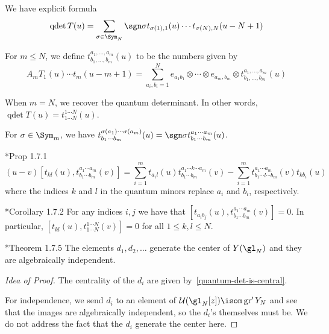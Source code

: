 \documentclass[11pt,leqno,oneside]{amsbook}
\numberwithin{thm}{section}
\newcommand{\U}{\mathcal{U}}
\newcommand{\associatedGraded}{\operatorname{gr}}
\newcommand{\qdet}{\operatorname{qdet}}
\begin{document}
\begin{prop}
  We have explicit formula \[
    \qdet T(u) = \sum_{\sigma \in \Sym_N} \sgn \sigma
    t_{\sigma(1),1}(u) \cdots t_{\sigma(N),N}(u-N+1) 
  \]
\end{prop}
\begin{defn}
  For \(m \leq N\), we define 
  \(t^{a_1,\ldots,a_m}_{b_1,\ldots,b_m}(u)\) to be the numbers given
  by \[
    A_m T_1(u) \cdots t_m(u-m+1) = \sum_{a_i,b_i=1}^N e_{a_1 b_1}
    \otimes \cdots \otimes e_{a_m, b_m} \otimes t^{a_1,\ldots,a_m}_{b_1,\ldots,b_m}(u)
  \]
\end{defn}
\begin{rmk}
  When \(m=N\), we recover the quantum determinant. In other words,
  \(\qdet T(u) = t^{1 \cdots N}_{1 \cdots N}(u)\).
\end{rmk}
\begin{prop}
  For \(\sigma \in \Sym_m\), we have \(t^{\sigma(a_1) \cdots
    \sigma(a_m)}_{b_1 \cdots b_m}(u) = \sgn \sigma t^{a_1 \cdots
    a_m}_{b_1 \cdots b_m}(u)\).
\end{prop}
\begin{lem}
  \cite{molev}*{Prop 1.7.1} \[
    (u-v)[t_{kl}(u),t^{a_1\cdots a_m}_{b_1 \cdots b_m}(v)] =
    \sum_{i=1}^m t_{a_i l}(u)t^{a_1 \cdots k \cdots a_m}_{b_1 \cdots
      b_m}(v) - \sum_{i=1}^m t^{a_1 \cdots a_m}_{b_1 \cdots l \cdots
      b_m}(v)t_{k b_i}(u)
  \]
  where the indices \(k\) and \(l\) in the quantum minors replace
  \(a_i\) and \(b_i\), respectively.
\end{lem}
\begin{cor}\label{quantum-det-is-central}
  \cite{molev}*{Corollary 1.7.2} For any indices \(i,j\) we have that
  \([t_{a_i b_j}(u), t^{a_1 
    \cdots a_m}_{b_1 \cdots b_m}(v)] = 0\). In particular,
  \([t_{kl}(u), t^{1 \cdots N}_{1 \cdots N}(v)] = 0\) for all \(1 \leq
  k,l \leq N\). 
\end{cor}
\begin{thm}
  \cite{molev}*{Theorem 1.7.5} The elements \(d_1, d_2, \ldots\) generate the center of
  \(Y(\gl_N)\) and they are algebraically independent. 
\end{thm}
\begin{proof}[Idea of Proof]
  The centrality of the \(d_i\) are given
  by~\ref{quantum-det-is-central}.
  
  For independence, we send \(d_i\) to an element of \(\U(\gl_N[z]) \isom
  \associatedGraded' Y_N\) and see that the images are algebraically
  independent, so the \(d_i\)'s themselves must be. We do not address
  the fact that the \(d_i\) generate the center here.
\end{proof}
\begin{bibdiv}
  \begin{biblist}
  \end{biblist}
\end{bibdiv}
\end{document}
